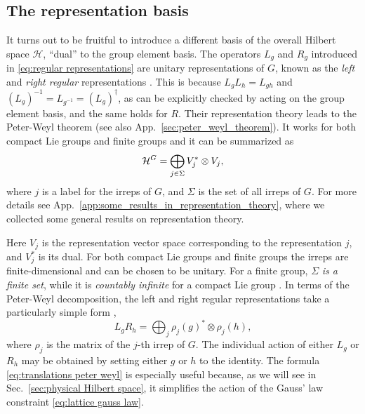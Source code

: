\subsection{The representation basis}%
\label{sub:the_representation_basis}

It turns out to be fruitful to introduce a different basis of the overall Hilbert space $\mathcal{H}$, ``dual'' to the group element basis.
The operators $L_g$ and $R_g$ introduced in \eqref{eq:regular representations} are unitary representations of $G$, known as the \textit{left} and \textit{right regular} representations \cite{serre1967representations, knapp1996lie}.
This is because $L_g L_h = L_{gh}$ and $(L_g)^{-1}=L_{g^{-1}}=(L_g)^\dagger$, as can be explicitly checked by acting on the group element basis, and the same holds for $R$.
Their representation theory leads to the Peter-Weyl theorem \cite{knapp1996lie, milstead2018qyangmills} (see also App.~\ref{sec:peter_weyl_theorem}).
It works for both compact Lie groups and finite groups and it can be summarized as
\begin{equation}
    \label{eq:peterweyl}
    \mathcal{H}^{G} = \bigoplus_{j \in \Sigma} V_j^* \otimes V_j,
\end{equation}
where $j$ is a label for the \acp{irrep} of $G$, and $\Sigma$ is the set of all \acp{irrep} of $G$.
For more details see App.~\ref{app:some_results_in_representation_theory}, where we collected some general results on representation theory.

Here $V_j$ is the representation vector space corresponding to the representation $j$, and $V_j^{\ast}$ is its dual.
For both compact Lie groups and finite groups the \acp{irrep} are finite-dimensional and can be chosen to be unitary.
For a finite group, $\Sigma$ \emph{is a finite set}, while it is \emph{countably infinite} for a compact Lie group \cite{knapp1996lie, serre1967representations}.
In terms of the Peter-Weyl decomposition, the left and right regular representations take a particularly simple form \cite{marianithesis},
\begin{equation}
    L_g R_h = \bigoplus_j \rho_j(g)^* \otimes \rho_j(h),
    \label{eq:translations peter weyl}
\end{equation}
where $\rho_j$ is the matrix of the $j$-th \ac{irrep} of $G$.
The individual action of either $L_g$ or $R_h$ may be obtained by setting either $g$ or $h$ to the identity.
The formula \eqref{eq:translations peter weyl} is especially useful because, as we will see in Sec.~\ref{sec:physical Hilbert space}, it simplifies the action of the Gauss' law constraint \eqref{eq:lattice gauss law}.

